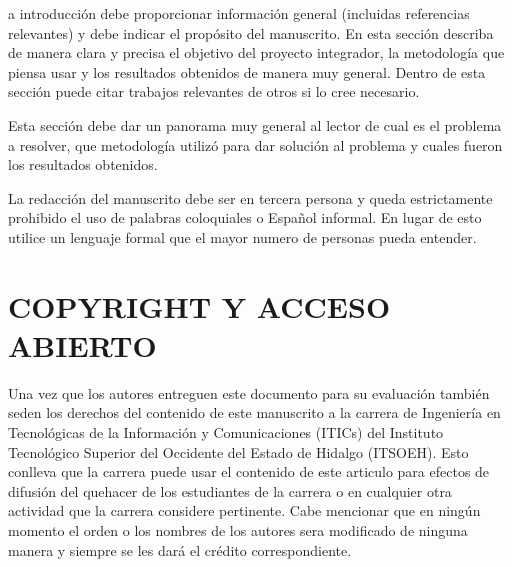 \documentclass{IEEEcsmag}
\begin{document}
\maketitle
{}a introducción debe proporcionar información general (incluidas referencias relevantes) y debe indicar el propósito del manuscrito. En esta sección describa de manera clara y precisa el objetivo del proyecto integrador, la metodología que piensa usar y los resultados obtenidos de manera muy general. Dentro de esta sección puede citar trabajos relevantes de otros si lo cree necesario.

Esta sección debe dar un panorama muy general al lector de cual es el problema a resolver, que metodología utilizó para dar solución al problema y cuales fueron los resultados obtenidos. 

La redacción del manuscrito debe ser en tercera persona y queda estrictamente prohibido el uso de palabras coloquiales o Español informal. En lugar de esto utilice un lenguaje formal que el mayor numero de personas pueda entender.

\section{COPYRIGHT Y ACCESO ABIERTO}

Una vez que los autores entreguen este documento para su evaluación también seden los derechos del contenido de este manuscrito a la carrera de Ingeniería en Tecnológicas de la Información y Comunicaciones (ITICs) del Instituto Tecnológico Superior del Occidente del Estado de Hidalgo (ITSOEH). Esto conlleva que la carrera puede usar el contenido de este articulo para efectos de difusión del quehacer de los estudiantes de la carrera o en cualquier otra actividad que la carrera considere pertinente. Cabe mencionar que en ningún momento el orden o los nombres de los autores sera modificado de ninguna manera y siempre se les dará el crédito correspondiente. 
\end{document}
